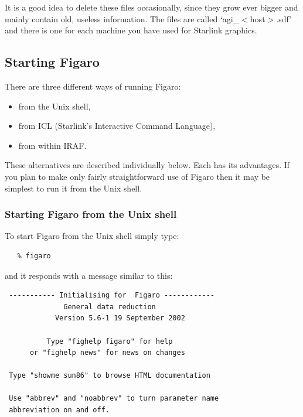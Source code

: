 \documentclass[11pt,twoside]{article}
\newcommand{\xlabel}[1]{}
\begin{document}
   It is a good idea to delete these files occasionally, since they grow
   ever bigger and mainly contain old, useless information. The files are
   called `agi\_$<$host$>$.sdf' and there is one for each machine you
   have used for Starlink graphics.


\subsection{\xlabel{starting_figaro}\label{starting}Starting Figaro}

There are three different ways of running Figaro:

\begin{itemize}

  \item from the Unix shell,

  \item from ICL (Starlink's Interactive Command Language),

  \item from within IRAF.

\end{itemize}

These alternatives are described individually below.  Each has its
advantages.  If you plan to make only fairly straightforward use of
Figaro then it may be simplest to run it from the Unix shell.

\subsubsection{Starting Figaro from the Unix shell}

To start Figaro from the Unix shell simply type:

\begin{verbatim}
   % figaro
\end{verbatim}

   and it responds with a message similar to this:

\begin{verbatim}
 ----------- Initialising for  Figaro ------------
              General data reduction
            Version 5.6-1 19 September 2002

          Type "fighelp figaro" for help
      or "fighelp news" for news on changes

 Type "showme sun86" to browse HTML documentation

 Use "abbrev" and "noabbrev" to turn parameter name
 abbreviation on and off.
\end{verbatim}
\end{document}
